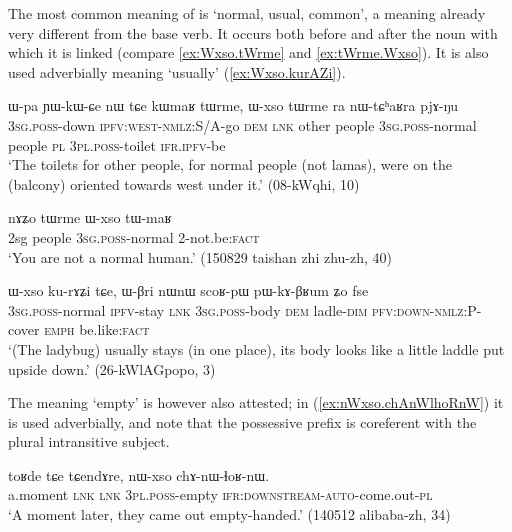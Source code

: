 The most common meaning of  is `normal, usual, common', a meaning already very different from the base verb. It occurs both before and after the noun with which it is linked (compare \ref{ex:Wxso.tWrme} and \ref{ex:tWrme.Wxso}). It is also used adverbially meaning `usually' (\ref{ex:Wxso.kurAZi}).

\begin{exe}
\ex \label{ex:Wxso.tWrme}
\gll ɯ-pa ɲɯ-kɯ-ɕe nɯ tɕe kɯmaʁ tɯrme, ɯ-xso tɯrme ra nɯ-tɕʰaʁra pjɤ-ŋu \\
\textsc{3sg.poss}-down \textsc{ipfv}:\textsc{west}-\textsc{nmlz}:S/A-go \textsc{dem} \textsc{lnk} other people \textsc{3sg.poss}-normal people \textsc{pl} \textsc{3pl.poss}-toilet \textsc{ifr.ipfv}-be \\
\glt `The toilets for other people, for normal people (not lamas), were on the (balcony) oriented towards west under it.' (08-kWqhi, 10)
\end{exe} 

\begin{exe}
\ex \label{ex:tWrme.Wxso}
\gll   nɤʑo tɯrme ɯ-xso tɯ-maʁ \\
2sg people  \textsc{3sg.poss}-normal  2-not.be:\textsc{fact} \\
\glt `You are not a normal human.' (150829 taishan zhi zhu-zh, 40)
\end{exe} 

\begin{exe}
\ex \label{ex:Wxso.kurAZi}
\gll  ɯ-xso ku-rɤʑi tɕe,  ɯ-βri nɯnɯ scoʁ-pɯ pɯ-kɤ-βʁum ʑo fse  \\
\textsc{3sg.poss}-normal \textsc{ipfv}-stay \textsc{lnk} \textsc{3sg.poss}-body \textsc{dem} ladle-\textsc{dim} \textsc{pfv}:\textsc{down}-\textsc{nmlz}:P-cover \textsc{emph} be.like:\textsc{fact} \\
\glt `(The ladybug) usually stays (in one place), its body looks like a little laddle put upside down.' (26-kWlAGpopo, 3)
\end{exe} 

The meaning `empty' is however also attested; in (\ref{ex:nWxso.chAnWlhoRnW}) it is used adverbially, and note that the possessive prefix is coreferent with the plural intransitive subject.

\begin{exe}
\ex \label{ex:nWxso.chAnWlhoRnW}
\gll toʁde tɕe tɕendɤre, nɯ-xso chɤ-nɯ-ɬoʁ-nɯ. \\
a.moment \textsc{lnk} \textsc{lnk} \textsc{3pl.poss}-empty \textsc{ifr}:\textsc{downstream}-\textsc{auto}-come.out-\textsc{pl} \\
\glt `A moment later, they came out empty-handed.' (140512 alibaba-zh, 34)
\end{exe} 

